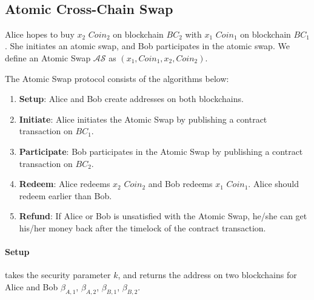 \\

\subsection{Atomic Cross-Chain Swap}

Alice hopes to buy $x_2$ $Coin_2$ on blockchain $BC_2$ with $x_1$ $Coin_1$ on blockchain $BC_1$.
She initiates an atomic swap, and Bob participates in the atomic swap.
We define an Atomic Swap $\mathcal{AS}$ as $(x_1, Coin_1, x_2, Coin_2)$.

The Atomic Swap protocol consists of the algorithms below:

\begin{enumerate}
    \item \textbf{Setup}: Alice and Bob create addresses on both blockchains.
    \item \textbf{Initiate}: Alice initiates the Atomic Swap by publishing a contract transaction on $BC_1$.
    \item \textbf{Participate}: Bob participates in the Atomic Swap by publishing a contract transaction on $BC_2$.
    \item \textbf{Redeem}: Alice redeems $x_2$ $Coin_2$ and Bob redeems $x_1$ $Coin_1$. Alice should redeem earlier than Bob.
    \item \textbf{Refund}: If Alice or Bob is unsatisfied with the Atomic Swap, he/she can get his/her money back after the timelock of the contract transaction.
\end{enumerate}

\paragraph{Setup}
takes the security parameter $k$,
and returns the address on two blockchains for Alice and Bob $\beta_{A, 1}$, $\beta_{A, 2}$, $\beta_{B, 1}$, $\beta_{B, 2}$.

